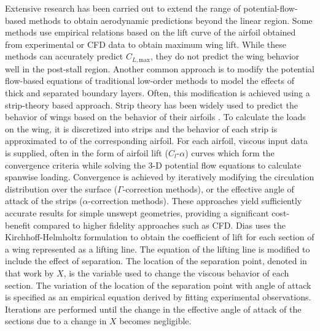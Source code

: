 Extensive research has been carried out to extend the range of potential-flow-based methods to obtain aerodynamic predictions beyond the linear region. Some methods \cite{Valarezo1994,Phillips2007} use empirical relations based on the lift curve of the airfoil obtained from experimental or CFD data to obtain maximum wing lift. While these methods can accurately predict $C_{L,\text{max}}$, they do not predict the wing behavior well in the post-stall region.
Another common approach is
to modify the potential flow-based equations of traditional low-order methods to
model the effects of thick and separated boundary layers. {Often, this
modification is achieved using a strip-theory based approach. Strip theory has been widely used to predict the behavior of wings based on the behavior of their airfoils \cite{Rodden1959,PamadiTaylor-1984-JofAC-SpinningAirplane,Liu1988,Cebeci1989,Wang2010,Castellani2017}.} To calculate the loads on the wing, it
is discretized into strips and the behavior of each strip is approximated to  of the corresponding airfoil.
For each airfoil, viscous input data is supplied, often in the form of airfoil
lift ($C_l$-$\alpha$) curves which form the convergence criteria while solving the
3-D potential flow equations to calculate spanwise loading. Convergence is achieved by iteratively modifying the circulation distribution over the surface
\cite{tani_1934,schairer_1939,sivells_neely_1947,sears_1956,levinsky_1976,piszkin_levinsky_1976,anderson_llt_1980,mccormick_nonlinear_llt_1989}
($\Gamma$-correction methods),
or the effective angle of attack of the strips \cite{Purser1951,Hunton1953,tseng_lan_1988,bruce_owens_nonlinear_weissinger,van_dam_nonlin_wing_2001,wickenheiser_garcia_2011} ($\alpha$-correction methods).
These approaches yield sufficiently accurate results for simple unswept
geometries, providing a significant cost-benefit compared to higher fidelity
approaches such as CFD.
Dias \cite{Dias2016} uses the Kirchhoff-Helmholtz formulation to obtain the coefficient of lift for each section of a wing represented as a lifting line. The equation of the lifting line is modified to include the effect of separation. The location of the separation point, denoted in that work by $X$, is the variable used to change the viscous behavior of each section. The variation of the location of the separation point with angle of attack is specified as an empirical equation derived by fitting experimental observations. Iterations are performed until the change in the effective angle of attack of the sections due to a change in $X$ becomes negligible.
